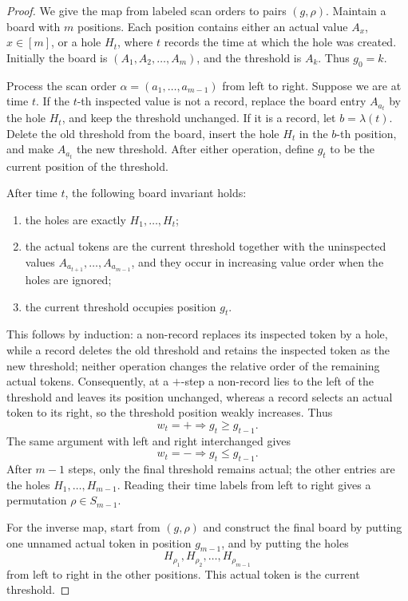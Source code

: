 \documentclass[10pt,a4paper]{amsart}
\begin{document}
\begin{proof}
We give the map from labeled scan orders to pairs \((g,\rho)\).  Maintain a
board with \(m\) positions.  Each position contains either an actual value
\(A_x\), \(x\in[m]\), or a hole \(H_t\), where \(t\) records the time at which
the hole was created.  Initially the board is $(A_1,A_2,\ldots,A_m)$, and the threshold is \(A_k\). Thus \(g_0=k\).

Process the scan order $\alpha=(a_1,\ldots,a_{m-1})$ from left to right.  Suppose we are at time \(t\).  If the \(t\)-th inspected
value is not a record, replace the board entry \(A_{a_t}\) by the hole
\(H_t\), and keep the threshold unchanged.  If it is a record, let
\(b=\lambda(t)\).  Delete the old threshold from the board, insert the hole
\(H_t\) in the \(b\)-th position, and make \(A_{a_t}\) the new threshold.
After either operation, define \(g_t\) to be the current position of the
threshold.

After time \(t\), the following board invariant holds:
\begin{enumerate}[label=(\roman*)]
\item the holes are exactly \(H_1,\ldots,H_t\);
\item the actual tokens are the current threshold together with the
uninspected values \(A_{a_{t+1}},\ldots,A_{a_{m-1}}\), and they occur in
increasing value order when the holes are ignored;
\item the current threshold occupies position \(g_t\).
\end{enumerate}
This follows by induction: a non-record replaces its inspected token by a
hole, while a record deletes the old threshold and retains the inspected token
as the new threshold; neither operation changes the relative order of the
remaining actual tokens.  Consequently, at a \(+\)-step a non-record lies to
the left of the threshold and leaves its position unchanged, whereas a record
selects an actual token to its right, so the threshold position weakly
increases.  Thus
\[
w_t=+\Longrightarrow g_t\ge g_{t-1}.
\]
The same argument with left and right interchanged gives
\[
w_t=-\Longrightarrow g_t\le g_{t-1}.
\]
After \(m-1\) steps, only the final threshold remains actual; the other
entries are the holes \(H_1,\ldots,H_{m-1}\).  Reading their time labels from
left to right gives a permutation \(\rho\in S_{m-1}\).

For the inverse map, start from \((g,\rho)\) and construct the final
board by putting one unnamed actual token in position \(g_{m-1}\), and by
putting the holes
\[
H_{\rho_1},H_{\rho_2},\ldots,H_{\rho_{m-1}}
\]
from left to right in the other positions.  This actual token is the current
threshold.


\end{proof}
\end{document}
